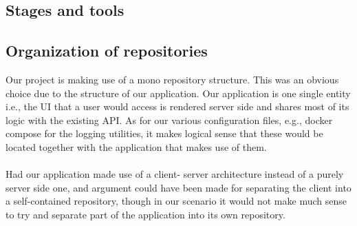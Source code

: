 \subsection{Stages and tools}
\subsection{Organization of repositories}
Our project is making use of a mono repository structure. This was an obvious choice due to the structure of our application. Our application is one single entity i.e., the UI that a user would access is rendered server side and shares most of its logic with the existing API. As for our various configuration files, e.g., docker compose for the logging utilities, it makes logical sense that these would be located together with the application that makes use of them.
\\\\
Had our application made use of a client- server architecture instead of a purely server side one, and argument could have been made for separating the client into a self-contained repository, though in our scenario it would not make much sense to try and separate part of the application into its own repository.
